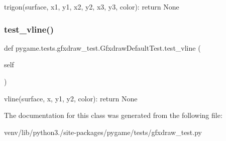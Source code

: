 \begin{DoxyVerb}trigon(surface, x1, y1, x2, y2, x3, y3, color): return None\end{DoxyVerb}
 \mbox{\label{classpygame_1_1tests_1_1gfxdraw__test_1_1_gfxdraw_default_test_a7d231840bc4cb90729243b049a3c8b0d}} 
\subsubsection{\texorpdfstring{test\+\_\+vline()}{test\_vline()}}
{\footnotesize\ttfamily def pygame.\+tests.\+gfxdraw\+\_\+test.\+Gfxdraw\+Default\+Test.\+test\+\_\+vline (\begin{DoxyParamCaption}\item[{}]{self }\end{DoxyParamCaption})}

\begin{DoxyVerb}vline(surface, x, y1, y2, color): return None\end{DoxyVerb}
 

The documentation for this class was generated from the following file\+:\begin{DoxyCompactItemize}
\item 
venv/lib/python3./site-\/packages/pygame/tests/gfxdraw\+\_\+test.\+py\end{DoxyCompactItemize}
